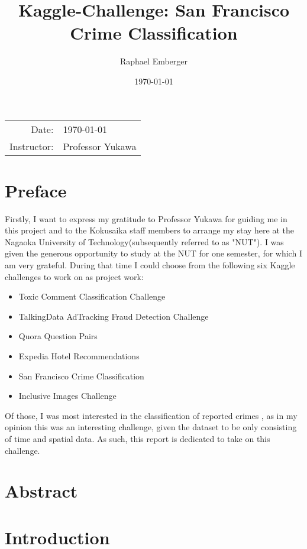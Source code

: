 \documentclass[titlepage,12pt]{article}
\author{Raphael Emberger}
\title{Kaggle-Challenge: San Francisco Crime Classification}
\date{\today}
\begin{document}
\maketitle

\begin{center}
\begin{tabular}{r l}
Date: & \today\\
Instructor: & Professor Yukawa
\end{tabular}
\end{center}

\tableofcontents
\pagebreak

\section{Preface}\label{s:preface}
Firstly, I want to express my gratitude to Professor Yukawa for guiding me in this project and to the Kokusaika staff members to arrange my stay here at the Nagaoka University of Technology(subsequently referred to as "NUT").
I was given the generous opportunity to study at the NUT for one semester, for which I am very grateful. During that time I could choose from the following six Kaggle challenges to work on as project work:
\begin{itemize}
\item Toxic Comment Classification Challenge \citep{kgl_toxic_comment}
\item TalkingData AdTracking Fraud Detection Challenge \citep{kgl_talking_data}
\item Quora Question Pairs \citep{kgl_quora}
\item Expedia Hotel Recommendations \citep{kgl_expedia}
\item San Francisco Crime Classification \citep{kgl_sf_crime}
\item Inclusive Images Challenge \citep{kgl_inclusive_images}
\end{itemize}
Of those, I was most interested in the classification of reported crimes \citep{kgl_sf_crime}, as in my opinion this was an interesting challenge, given the dataset to be only consisting of time and spatial data. As such, this report is dedicated to take on this challenge.

\pagebreak
\section{Abstract}\label{s:abstract}

\pagebreak
\section{Introduction}\label{s:intro}
\end{document}
